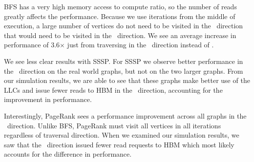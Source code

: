 BFS has a very high memory access to compute ratio, so the number of reads greatly affects the performance.
Because we use iterations from the middle of execution, a large number of vertices do not need to be visited in the \pull~direction that would need to be visited in the \push~direction. %
We see an average increase in performance of 3.6$\times$ just from traversing in the \pull~direction instead of \push. 
 
We see less clear results with SSSP.
For SSSP we observe better performance in the \pull~direction on the real world graphs, but not on the two larger \kron graphs.
From our simulation results, we are able to see that these \kron graphs make better use of the LLCs and issue fewer reads to HBM in the \push~direction, accounting for the improvement in performance. 
 
Interestingly, PageRank sees a performance improvement across all graphs in the \pull~direction.
Unlike BFS, PageRank must visit all vertices in all iterations regardless of traversal direction.
When we examined our simulation results, we saw that the \pull~direction issued fewer read requests to HBM which most likely accounts for the difference in performance. 
 
  
 
